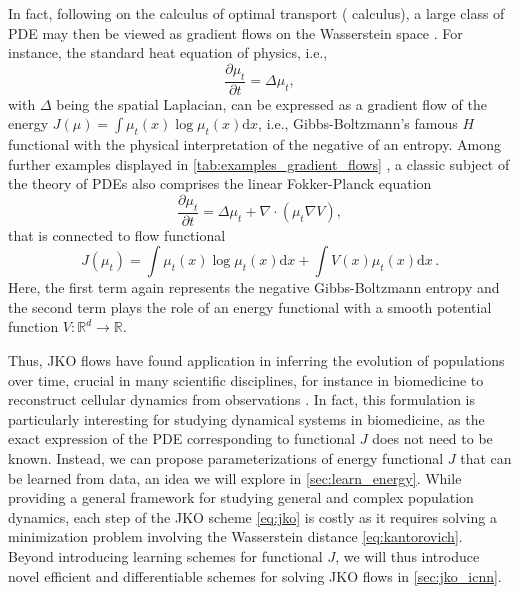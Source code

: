 In fact, following \citet{otto2001geometry} on the calculus of optimal transport (\citeauthor{otto2001geometry} calculus), a large class of \acrlong{PDE} may then be viewed as gradient flows on the Wasserstein space \citep{jordan1998variational}.
For instance, the standard heat equation of physics, i.e.,
\begin{equation*}
	\frac{\partial \mu_t}{\partial t} = \Delta \mu_t,
\end{equation*}
with $\Delta$ being the spatial Laplacian, can be expressed as a gradient flow of the energy $J(\mu) = \int \mu_t(x) \log \mu_t(x) \mathrm{d} x$, i.e., Gibbs-Boltzmann's famous $H$ functional with the physical interpretation of the negative of an entropy.
Among further examples displayed in \cref{tab:examples_gradient_flows} \citep{alvarez2021optimizing, villani2021topics}, a classic subject of the theory of PDEs also comprises the linear Fokker-Planck equation
\begin{equation}
	\label{eq:linear_fokker_planck}
	\frac{\partial \mu_t}{\partial t} = \Delta \mu_t+\nabla \cdot(\mu_t \nabla V),
\end{equation}
that is connected to flow functional
\begin{equation*}
	J(\mu_t) = \int \mu_t(x) \log \mu_t(x) \mathrm{d} x+\int V(x) \mu_t(x) \mathrm{d}x\,.
\end{equation*}
Here, the first term again represents the negative Gibbs-Boltzmann entropy and the second term plays the role of an energy functional with a smooth potential function $V: \mathbb{R}^d \rightarrow \mathbb{R}$.


Thus, \acrshort{JKO} flows have found application in inferring the evolution of populations over time, crucial in many scientific disciplines, for instance in biomedicine to reconstruct cellular dynamics from observations \citep{bunne2022proximal, alvarez2021optimizing, mokrov2021large, benamou2016augmented}.
In fact, this formulation is particularly interesting for studying dynamical systems in biomedicine, as the exact expression of the PDE corresponding to functional $J$ does not need to be known.
Instead, we can propose parameterizations of energy functional $J$ that can be learned from data, an idea we will explore in \cref{sec:learn_energy}.
While providing a general framework for studying general and complex population dynamics, each step of the JKO scheme \eqref{eq:jko} is costly as it requires solving a minimization problem involving the Wasserstein distance \eqref{eq:kantorovich}. Beyond introducing learning schemes for functional $J$, we will thus introduce novel efficient and differentiable schemes for solving JKO flows in \cref{sec:jko_icnn}.


